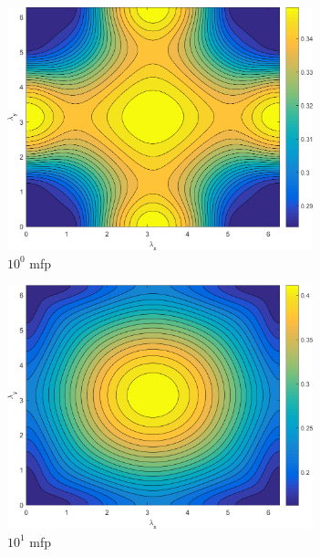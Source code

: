 \begin{figure}
	{
	\begin{subfigure}[b]{0.485\textwidth}
		\centering
		\includegraphics[width=0.975\textwidth]{figures/sec_DSA/SI_MIP_C=4_UPWLD1_LS16_x=1_dydx=1_contour.png}
		\caption{$10^{0}$ mfp}
	\end{subfigure}
	\hfill
	\begin{subfigure}[b]{0.485\textwidth}
		\centering
		\includegraphics[width=0.975\textwidth]{figures/sec_DSA/SI_MIP_C=4_UPWLD1_LS16_x=10_dydx=1_contour.png}
		\caption{$10^{1}$ mfp}
	\end{subfigure}
	}
	\vspace{0.5cm}
	{
	\begin{subfigure}[b]{0.485\textwidth}

\end{subfigure}}
\end{figure}
